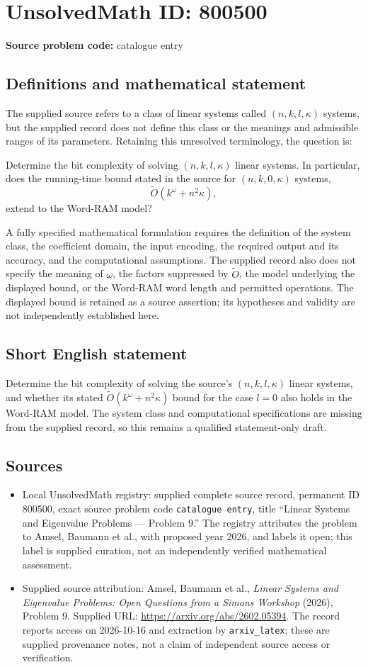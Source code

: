 \documentclass[11pt]{article}
\begin{document}
\section*{UnsolvedMath ID: 800500}
\textbf{Source problem code:} catalogue entry
\subsection{Definitions and mathematical statement}
The supplied source refers to a class of linear systems called \((n,k,l,\kappa)\) systems, but the supplied record does not define this class or the meanings and admissible ranges of its parameters. Retaining this unresolved terminology, the question is:

Determine the bit complexity of solving \((n,k,l,\kappa)\) linear systems. In particular, does the running-time bound stated in the source for \((n,k,0,\kappa)\) systems,
\[
\widetilde O\!\left(k^\omega+n^2\kappa\right),
\]
extend to the Word-RAM model?

A fully specified mathematical formulation requires the definition of the system class, the coefficient domain, the input encoding, the required output and its accuracy, and the computational assumptions. The supplied record also does not specify the meaning of \(\omega\), the factors suppressed by \(\widetilde O\), the model underlying the displayed bound, or the Word-RAM word length and permitted operations. The displayed bound is retained as a source assertion; its hypotheses and validity are not independently established here.
\subsection{Short English statement}
Determine the bit complexity of solving the source's \((n,k,l,\kappa)\) linear systems, and whether its stated \(\widetilde O(k^\omega+n^2\kappa)\) bound for the case \(l=0\) also holds in the Word-RAM model. The system class and computational specifications are missing from the supplied record, so this remains a qualified statement-only draft.
\subsection{Sources}
\begin{itemize}
\item Local UnsolvedMath registry: supplied complete source record, permanent ID \(800500\), exact source problem code \texttt{catalogue entry}, title ``Linear Systems and Eigenvalue Problems — Problem 9.'' The registry attributes the problem to Amsel, Baumann et al., with proposed year 2026, and labels it open; this label is supplied curation, not an independently verified mathematical assessment.
\item Supplied source attribution: Amsel, Baumann et al., \emph{Linear Systems and Eigenvalue Problems: Open Questions from a Simons Workshop} (2026), Problem 9. Supplied URL: \url{https://arxiv.org/abs/2602.05394}. The record reports access on 2026-10-16 and extraction by \texttt{arxiv\_latex}; these are supplied provenance notes, not a claim of independent source access or verification.
\end{itemize}
\end{document}
